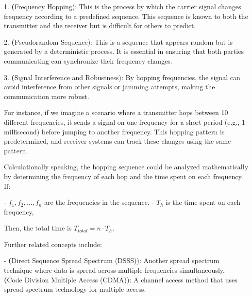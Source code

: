 1. \textbf(Frequency Hopping): This is the process by which the carrier signal changes frequency according to a predefined sequence. This sequence is known to both the transmitter and the receiver but is difficult for others to predict.

2. \textbf(Pseudorandom Sequence): This is a sequence that appears random but is generated by a deterministic process. It is essential in ensuring that both parties communicating can synchronize their frequency changes.

3. \textbf(Signal Interference and Robustness): By hopping frequencies, the signal can avoid interference from other signals or jamming attempts, making the communication more robust.

For instance, if we imagine a scenario where a transmitter hops between 10 different frequencies, it sends a signal on one frequency for a short period (e.g., 1 millisecond) before jumping to another frequency. This hopping pattern is predetermined, and receiver systems can track these changes using the same pattern.

Calculationally speaking, the hopping sequence could be analyzed mathematically by determining the frequency of each hop and the time spent on each frequency. If:

- \(f_1, f_2, \ldots, f_n\) are the frequencies in the sequence,
- \(T_h\) is the time spent on each frequency,

Then, the total time is \(T_{total} = n \cdot T_h\).

Further related concepts include:

- \textbf(Direct Sequence Spread Spectrum (DSSS)): Another spread spectrum technique where data is spread across multiple frequencies simultaneously.
- \textbf(Code Division Multiple Access (CDMA)): A channel access method that uses spread spectrum technology for multiple access.

